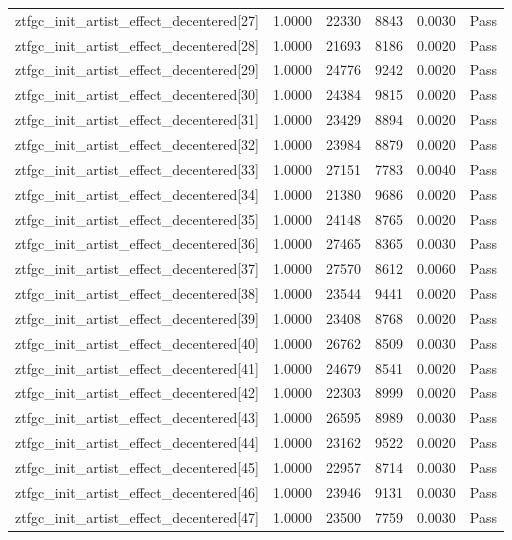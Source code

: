 \begin{table}[htbp]
\begin{tabular}{llrrll}
ztfgc\_init\_artist\_effect\_decentered[27] & 1.0000 & 22330 & 8843 & 0.0030 & Pass \\
ztfgc\_init\_artist\_effect\_decentered[28] & 1.0000 & 21693 & 8186 & 0.0020 & Pass \\
ztfgc\_init\_artist\_effect\_decentered[29] & 1.0000 & 24776 & 9242 & 0.0020 & Pass \\
ztfgc\_init\_artist\_effect\_decentered[30] & 1.0000 & 24384 & 9815 & 0.0020 & Pass \\
ztfgc\_init\_artist\_effect\_decentered[31] & 1.0000 & 23429 & 8894 & 0.0020 & Pass \\
ztfgc\_init\_artist\_effect\_decentered[32] & 1.0000 & 23984 & 8879 & 0.0020 & Pass \\
ztfgc\_init\_artist\_effect\_decentered[33] & 1.0000 & 27151 & 7783 & 0.0040 & Pass \\
ztfgc\_init\_artist\_effect\_decentered[34] & 1.0000 & 21380 & 9686 & 0.0020 & Pass \\
ztfgc\_init\_artist\_effect\_decentered[35] & 1.0000 & 24148 & 8765 & 0.0020 & Pass \\
ztfgc\_init\_artist\_effect\_decentered[36] & 1.0000 & 27465 & 8365 & 0.0030 & Pass \\
ztfgc\_init\_artist\_effect\_decentered[37] & 1.0000 & 27570 & 8612 & 0.0060 & Pass \\
ztfgc\_init\_artist\_effect\_decentered[38] & 1.0000 & 23544 & 9441 & 0.0020 & Pass \\
ztfgc\_init\_artist\_effect\_decentered[39] & 1.0000 & 23408 & 8768 & 0.0020 & Pass \\
ztfgc\_init\_artist\_effect\_decentered[40] & 1.0000 & 26762 & 8509 & 0.0030 & Pass \\
ztfgc\_init\_artist\_effect\_decentered[41] & 1.0000 & 24679 & 8541 & 0.0020 & Pass \\
ztfgc\_init\_artist\_effect\_decentered[42] & 1.0000 & 22303 & 8999 & 0.0020 & Pass \\
ztfgc\_init\_artist\_effect\_decentered[43] & 1.0000 & 26595 & 8989 & 0.0030 & Pass \\
ztfgc\_init\_artist\_effect\_decentered[44] & 1.0000 & 23162 & 9522 & 0.0020 & Pass \\
ztfgc\_init\_artist\_effect\_decentered[45] & 1.0000 & 22957 & 8714 & 0.0030 & Pass \\
ztfgc\_init\_artist\_effect\_decentered[46] & 1.0000 & 23946 & 9131 & 0.0030 & Pass \\
ztfgc\_init\_artist\_effect\_decentered[47] & 1.0000 & 23500 & 7759 & 0.0030 & Pass \\

\end{tabular}
\end{table}
